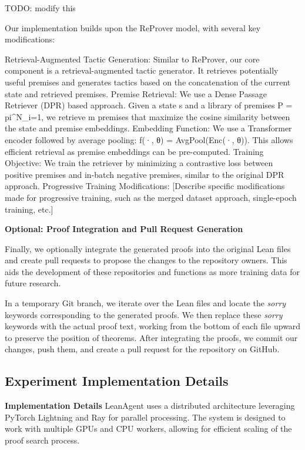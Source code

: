 \documentclass{article} %
\begin{document}
TODO: modify this


Our implementation builds upon the ReProver model, with several key modifications:

Retrieval-Augmented Tactic Generation: Similar to ReProver, our core component is a retrieval-augmented tactic generator. It retrieves potentially useful premises and generates tactics based on the concatenation of the current state and retrieved premises.
Premise Retrieval: We use a Dense Passage Retriever (DPR) based approach. Given a state s and a library of premises P = {pi}^N_{i=1}, we retrieve m premises that maximize the cosine similarity between the state and premise embeddings.
Embedding Function: We use a Transformer encoder followed by average pooling: f(·, θ) = AvgPool(Enc(·, θ)). This allows efficient retrieval as premise embeddings can be pre-computed.
Training Objective: We train the retriever by minimizing a contrastive loss between positive premises and in-batch negative premises, similar to the original DPR approach.
Progressive Training Modifications: [Describe specific modifications made for progressive training, such as the merged dataset approach, single-epoch training, etc.]

\textbf{Optional: Proof Integration and Pull Request Generation}

Finally, we optionally integrate the generated proofs into the original Lean files and create pull requests to propose the changes to the repository owners. This aids the development of these repositories and functions as more training data for future research.

In a temporary Git branch, we iterate over the Lean files and locate the  \textit{sorry} keywords corresponding to the generated proofs. We then replace these  \textit{sorry} keywords with the actual proof text, working from the bottom of each file upward to preserve the position of theorems. After integrating the proofs, we commit our changes, push them, and create a pull request for the repository on GitHub.

\subsection{Experiment Implementation Details}

\textbf{Implementation Details} LeanAgent uses a distributed architecture leveraging PyTorch Lightning and Ray for parallel processing. The system is designed to work with multiple GPUs and CPU workers, allowing for efficient scaling of the proof search process.
\end{document}
